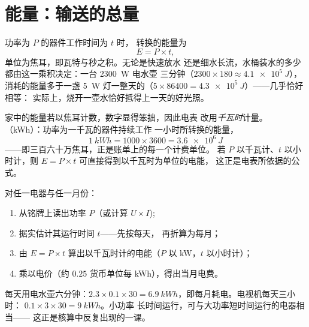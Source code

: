\section{能量：输送的总量}

\begin{proposition}[由功率与时间求能量]\label{prop:g9:electric-power-energy:Pt}
功率为 $P$ 的器件工作时间为 $t$ 时，
转换的能量为
\[
E = P \times t ,
\]
单位为焦耳，即瓦特与秒之积。无论是快速放水
还是细水长流，水桶装水的多少都由这一乘积决定：一台 \qty{2300}{W} 电水壶
三分钟（$2300 \times 180 \approx \qty{4.1e5}{J}$），
消耗的能量多于一盏 \qty{5}{W} 灯一整天的（$5 \times
86400 = \qty{4.3e5}{J}$）——几乎恰好相等：
实际上，烧开一壶水恰好抵得上一天的好光照。
\end{proposition}

\begin{definition}[千瓦时]\label{def:g9:electric-power-energy:kwh}
家中的能量若以焦耳计数，数字显得笨拙，因此电表
改用\emph{千瓦时}计量。
（\unit{kWh}）：功率为一千瓦的器件持续工作
一小时所转换的能量，
\[
\qty{1}{kWh} = 1000 \times 3600 = \qty{3.6e6}{J}
\]
——即三百六十万焦耳，正是账单上的每一个计费单位。
若 $P$ 以千瓦计、$t$ 以小时计，则 $E = P \times t$
可直接得到以千瓦时为单位的电能，
这正是电表所依据的公式。
\end{definition}

\begin{method}[电器耗电量的核算]\label{met:g9:electric-power-energy:audit}
对任一电器与任一月份：
\begin{enumerate}
  \item 从铭牌上读出功率 $P$（或计算
        $U \times I$);
  \item 据实估计其运行时间 $t$——先按每天，
        再折算为每月；
  \item 由 $E = P \times t$ 算出以千瓦时计的电能（$P$ 以
        \unit{kW}，$t$ 以小时计）；
  \item 乘以电价（约 $0.25$ 货币单位每
        \unit{kWh}），得出当月电费。
\end{enumerate}
每天用电水壶六分钟：$2.3 \times 0.1 \times 30 =
\qty{6.9}{kWh}$，即每月耗电。电视机每天三小时：
$0.1 \times 3 \times 30 = \qty{9}{kWh}$。小功率
长时间运行，可与大功率短时间运行的电器相当——
这正是核算中反复出现的一课。
\end{method}

